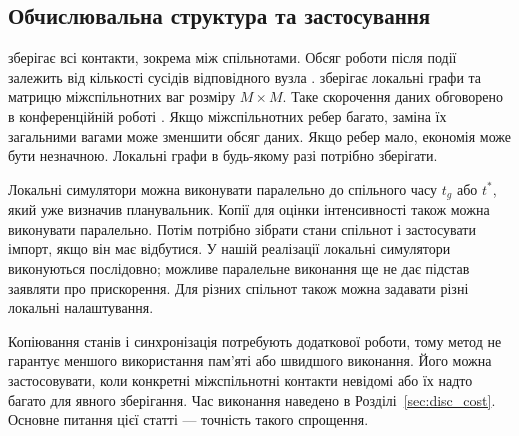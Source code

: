 \subsection{Обчислювальна структура та застосування}
\label{sec:cost}

\Full{} зберігає всі контакти, зокрема між спільнотами. Обсяг роботи після події залежить від кількості сусідів відповідного вузла \citep{kuryliak2025simulating}. \TS{} зберігає локальні графи та матрицю міжспільнотних ваг розміру $M\times M$. Таке скорочення даних обговорено в конференційній роботі \citep{kuryliak2025towards}. Якщо міжспільнотних ребер багато, заміна їх загальними вагами може зменшити обсяг даних. Якщо ребер мало, економія може бути незначною. Локальні графи в будь-якому разі потрібно зберігати.

Локальні симулятори можна виконувати паралельно до спільного часу $t_g$ або $t^\ast$, який уже визначив планувальник. Копії для оцінки інтенсивності також можна виконувати паралельно. Потім потрібно зібрати стани спільнот і застосувати імпорт, якщо він має відбутися. У нашій реалізації локальні симулятори виконуються послідовно; можливе паралельне виконання ще не дає підстав заявляти про прискорення. Для різних спільнот також можна задавати різні локальні налаштування.

Копіювання станів і синхронізація потребують додаткової роботи, тому метод не гарантує меншого використання пам'яті або швидшого виконання. Його можна застосовувати, коли конкретні міжспільнотні контакти невідомі або їх надто багато для явного зберігання. Час виконання наведено в Розділі~\ref{sec:disc_cost}. Основне питання цієї статті --- точність такого спрощення.

\clearpage
\endgroup

